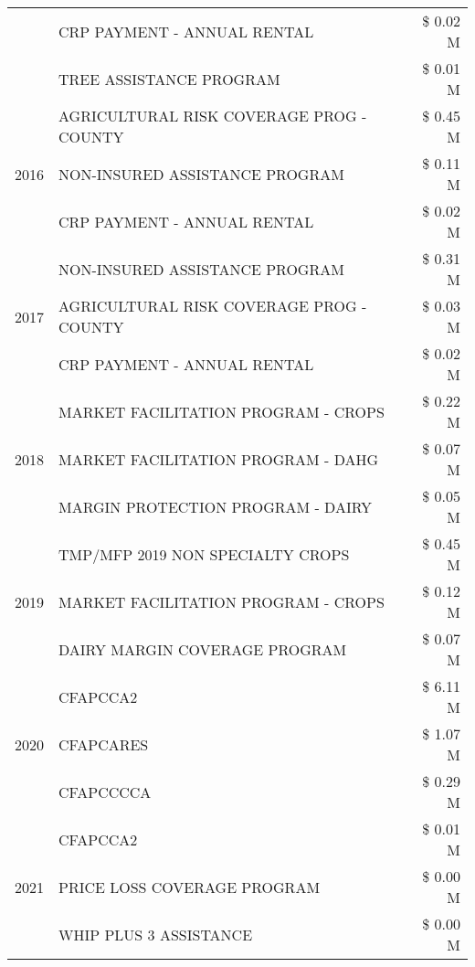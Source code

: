 \begin{tabular}{llr}
 & CRP PAYMENT - ANNUAL RENTAL & \$ 0.02 M \\
 & TREE ASSISTANCE PROGRAM & \$ 0.01 M \\
\cline{1-3}
\multirow[t]{3}{*}{2016} & AGRICULTURAL RISK COVERAGE PROG - COUNTY & \$ 0.45 M \\
 & NON-INSURED ASSISTANCE PROGRAM & \$ 0.11 M \\
 & CRP PAYMENT - ANNUAL RENTAL & \$ 0.02 M \\
\cline{1-3}
\multirow[t]{3}{*}{2017} & NON-INSURED ASSISTANCE PROGRAM & \$ 0.31 M \\
 & AGRICULTURAL RISK COVERAGE PROG - COUNTY & \$ 0.03 M \\
 & CRP PAYMENT - ANNUAL RENTAL & \$ 0.02 M \\
\cline{1-3}
\multirow[t]{3}{*}{2018} & MARKET FACILITATION PROGRAM - CROPS & \$ 0.22 M \\
 & MARKET FACILITATION PROGRAM - DAHG & \$ 0.07 M \\
 & MARGIN PROTECTION PROGRAM - DAIRY & \$ 0.05 M \\
\cline{1-3}
\multirow[t]{3}{*}{2019} & TMP/MFP 2019 NON SPECIALTY CROPS & \$ 0.45 M \\
 & MARKET FACILITATION PROGRAM - CROPS & \$ 0.12 M \\
 & DAIRY MARGIN COVERAGE PROGRAM & \$ 0.07 M \\
\cline{1-3}
\multirow[t]{3}{*}{2020} & CFAPCCA2 & \$ 6.11 M \\
 & CFAPCARES & \$ 1.07 M \\
 & CFAPCCCCA & \$ 0.29 M \\
\cline{1-3}
\multirow[t]{3}{*}{2021} & CFAPCCA2 & \$ 0.01 M \\
 & PRICE LOSS COVERAGE PROGRAM & \$ 0.00 M \\
 & WHIP PLUS 3 ASSISTANCE & \$ 0.00 M \\
\cline{1-3}
\bottomrule
\end{tabular}
